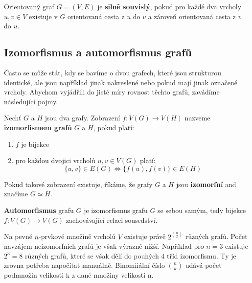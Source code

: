\medskip

\begin{definition}
Orientovaný graf $G = (V, E)$ je \textbf{silně souvislý}, pokud pro každé dva vrcholy $u, v \in V$ existuje v $G$ orientovaná cesta z $u$ do $v$ a zároveň orientovaná cesta z $v$ do $u$.
\end{definition} 

\medskip

\begin{center}
    
\end{center}

\subsection{Izomorfismus a automorfismus grafů}

Často se může stát, kdy se bavíme o dvou grafech, které jsou strukturou identické, ale jsou například jinak nakreslené nebo pokud mají jinak označené vrcholy. Abychom vyjádřili do jisté míry rovnost těchto grafů, zavádíme následující pojmy. \bigskip

\begin{definition}
Nechť $G$ a $H$ jsou dva grafy. Zobrazení $f : V(G) \to V(H)$ nazveme \textbf{izomorfismem grafů} $G$ a $H$, pokud platí:
\begin{enumerate}
    \item $f$ je bijekce
    \item pro každou dvojici vrcholů $u, v \in V(G)$ platí:
    $$\{u, v\} \in E(G) \iff \{f(u), f(v)\} \in E(H)$$
\end{enumerate}
Pokud takové zobrazení existuje, říkáme, že grafy $G$ a $H$ jsou \textbf{izomorfní} and značíme $G \simeq H$.
\end{definition} \bigskip

\begin{definition}
\textbf{Automorfismus} grafu $G$ je izomorfismus grafu $G$ se sebou samým, tedy bijekce $f : V(G) \to V(G)$ zachovávající relaci sousedství.
\end{definition} \bigskip

\begin{remark}
Na pevné $n$-prvkové množině vrcholů $V$ existuje právě $2^{\binom{n}{2}}$ různých grafů. Počet navzájem neizomorfních grafů je však výrazně nižší. Například pro $n=3$ existuje $2^3 = 8$ různých grafů, které se však dělí do pouhých 4 tříd izomorfismu. Ty je zrovna potřeba napočítat manuálně. Binomiiální číslo $\binom{n}{k}$ udává počet podmnožin velikosti k z dané množiny velikosti n.
\end{remark} \bigskip
